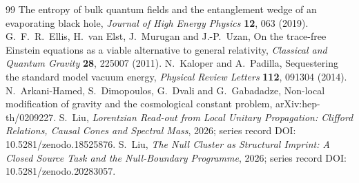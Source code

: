 \documentclass[12pt,a4paper]{article}
\theoremstyle{definition}
\begin{document}
\begin{thebibliography}{99}
The entropy of bulk quantum fields and the entanglement wedge of an evaporating black hole,
\emph{Journal of High Energy Physics} \textbf{12}, 063 (2019).
 G.~F.~R.~Ellis, H.~van Elst, J.~Murugan and J.-P.~Uzan,
On the trace-free Einstein equations as a viable alternative to general relativity,
\emph{Classical and Quantum Gravity} \textbf{28}, 225007 (2011).
 N.~Kaloper and A.~Padilla, Sequestering the standard model vacuum energy,
\emph{Physical Review Letters} \textbf{112}, 091304 (2014).
 N.~Arkani-Hamed, S.~Dimopoulos, G.~Dvali and G.~Gabadadze,
Non-local modification of gravity and the cosmological constant problem, arXiv:hep-th/0209227.
 S.~Liu, \emph{Lorentzian Read-out from Local Unitary Propagation: Clifford Relations, Causal Cones and Spectral Mass}, 2026; series record DOI: 10.5281/zenodo.18525876.
 S.~Liu, \emph{The Null Cluster as Structural Imprint: A Closed Source Task and the Null-Boundary Programme}, 2026; series record DOI: 10.5281/zenodo.20283057.
\end{thebibliography}
\end{document}

